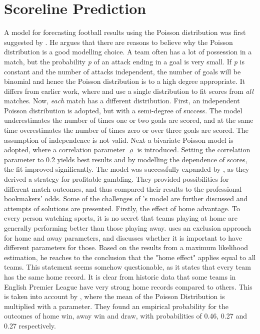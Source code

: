 \section{Scoreline Prediction} \label{Scoreline_prediction} 
A model for forecasting football results using the Poisson distribution was first suggested by \cite{Maher}. He argues that there are reasons to believe why the Poisson distribution is a good modelling choice. A team often has a lot of possession in a match, but the probability \textit{p} of an attack ending in a goal is very small. If \textit{p} is constant and the number of attacks independent, the number of goals will be binomial and hence the Poisson distribution is to a high degree appropriate. It differs from earlier work, where \cite{Moroney} and \cite{Reep} use a single distribution to fit scores from \textit{all} matches. Now, \textit{each} match has a different distribution. First, an independent Poisson distribution is adopted, but with a semi-degree of success. The model underestimates the number of times one or two goals are scored, and at the same time overestimates the number of times zero or over three goals are scored. The assumption of independence is not valid. Next a bivariate Poisson model is adopted, where a correlation parameter $\varrho$ is introduced. Setting the correlation parameter to 0.2 yields best results and by modelling the dependence of scores, the fit improved significantly. 
\newpar
The model was successfully expanded by \cite{Dixon}, as they derived a strategy for profitable gambling. They provided possibilities for different match outcomes, and thus compared their results to the professional bookmakers' odds. Some of the challenges of \cite{Maher}'s model are further discussed and attempts of solutions are presented. 
\newpar
Firstly, the effect of home advantage. To every person watching sports, it is no secret that teams playing at home are generally performing better than those playing away. \cite{Maher} uses an exclusion approach for home and away parameters, and discusses whether it is important to have different parameters for those. Based on the results from a maximum likelihood estimation, he reaches to the conclusion that the "home effect" applies equal to all teams. This statement seems somehow questionable, as it states that every team has the same home record. It is clear from historic data that some teams in English Premier League have very strong home records compared to others. This is taken into account by \cite{Dixon}, where the mean of the Poisson Distribution is multiplied  with a parameter. They found an empirical probability for the outcomes of home win, away win and draw, with probabilities of 0.46, 0.27 and 0.27 respectively. 

